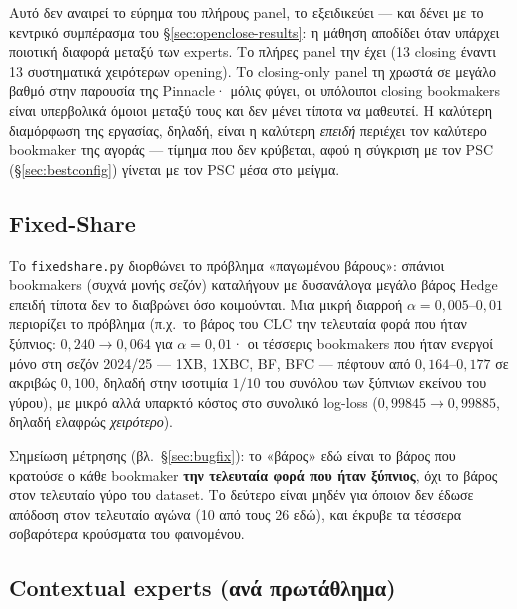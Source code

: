 \documentclass[11pt,a4paper]{article}
\newcommand{\file}[1]{\texttt{#1}}
\renewcommand{\_}{\oldunderscore\allowbreak}
\begin{document}
Αυτό δεν αναιρεί το εύρημα του πλήρους panel, το εξειδικεύει --- και δένει με το κεντρικό
συμπέρασμα του \S\ref{sec:openclose-results}: η μάθηση αποδίδει όταν υπάρχει ποιοτική
διαφορά μεταξύ των experts. Το πλήρες panel την έχει (13 closing έναντι 13 συστηματικά
χειρότερων opening). Το closing-only panel τη χρωστά σε μεγάλο βαθμό στην παρουσία της
Pinnacle· μόλις φύγει, οι υπόλοιποι closing bookmakers είναι υπερβολικά όμοιοι μεταξύ τους
και δεν μένει τίποτα να μαθευτεί. Η καλύτερη διαμόρφωση της εργασίας, δηλαδή, είναι η
καλύτερη \emph{επειδή} περιέχει τον καλύτερο bookmaker της αγοράς --- τίμημα που δεν
κρύβεται, αφού η σύγκριση με τον PSC (\S\ref{sec:bestconfig}) γίνεται με τον PSC μέσα στο
μείγμα.

\subsection{Fixed-Share}

Το \file{fixed\_share.py} διορθώνει το πρόβλημα «παγωμένου βάρους»: σπάνιοι bookmakers
(συχνά μονής σεζόν) καταλήγουν με δυσανάλογα μεγάλο βάρος Hedge επειδή τίποτα δεν
το διαβρώνει όσο κοιμούνται. Μια μικρή διαρροή $\alpha=0{,}005$--$0{,}01$ περιορίζει το
πρόβλημα (π.χ.\ το βάρος του CLC την τελευταία φορά που ήταν ξύπνιος:
$0{,}240 \to 0{,}064$ για $\alpha=0{,}01$· οι τέσσερις bookmakers που ήταν ενεργοί μόνο στη
σεζόν 2024/25 --- 1XB, 1XBC, BF, BFC --- πέφτουν από $0{,}164$--$0{,}177$ σε ακριβώς
$0{,}100$, δηλαδή στην ισοτιμία $1/10$ του συνόλου των ξύπνιων εκείνου του γύρου), με μικρό
αλλά υπαρκτό κόστος στο συνολικό log-loss ($0{,}99845 \to 0{,}99885$, δηλαδή ελαφρώς
\emph{χειρότερο}).

Σημείωση μέτρησης (βλ.\ \S\ref{sec:bugfix}): το «βάρος» εδώ είναι το βάρος που κρατούσε ο
κάθε bookmaker \textbf{την τελευταία φορά που ήταν ξύπνιος}, όχι το βάρος στον τελευταίο
γύρο του dataset. Το δεύτερο είναι μηδέν για όποιον δεν έδωσε απόδοση στον τελευταίο αγώνα
(10 από τους 26 εδώ), και έκρυβε τα τέσσερα σοβαρότερα κρούσματα του φαινομένου.

\subsection{Contextual experts (ανά πρωτάθλημα)}
\label{sec:contextual}
\end{document}
